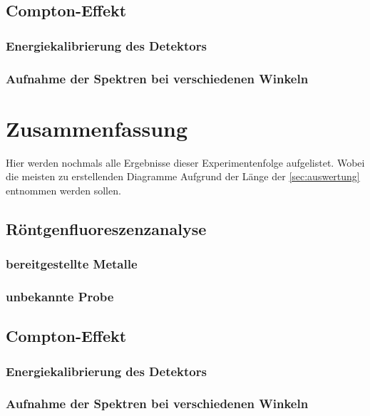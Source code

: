 \documentclass[12pt,english,ngerman]{scrartcl}
\begin{document}
\subsection{Compton-Effekt}

\subsubsection{Energiekalibrierung des Detektors}

\subsubsection{Aufnahme der Spektren bei verschiedenen Winkeln}



\section{Zusammenfassung}\label{sec:zusammenfassung}

Hier werden nochmals alle Ergebnisse dieser Experimentenfolge aufgelistet.
Wobei die meisten zu erstellenden Diagramme Aufgrund der Länge der
\autoref{sec:auswertung} entnommen werden sollen.

\subsection{Röntgenfluoreszenzanalyse}

\subsubsection{bereitgestellte Metalle}


\subsubsection{unbekannte Probe}


\subsection{Compton-Effekt}

\subsubsection{Energiekalibrierung des Detektors}

\subsubsection{Aufnahme der Spektren bei verschiedenen Winkeln}


\newpage
\printbibliography
\listoffigures
\listoftables
\end{document}
